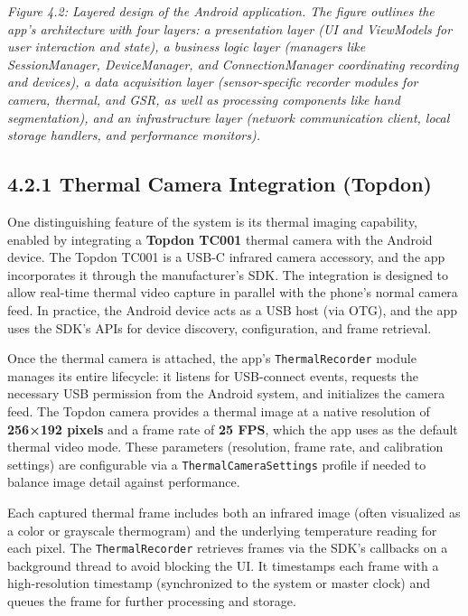 \textit{Figure 4.2: Layered design of the Android application. The figure outlines the app's architecture with four layers: a presentation layer (UI and ViewModels for user interaction and state), a business logic layer (managers like SessionManager, DeviceManager, and ConnectionManager coordinating recording and devices), a data acquisition layer (sensor-specific recorder modules for camera, thermal, and GSR, as well as processing components like hand segmentation), and an infrastructure layer (network communication client, local storage handlers, and performance monitors).}

\subsection{4.2.1 Thermal Camera Integration (Topdon)}

One distinguishing feature of the system is its thermal imaging capability, enabled by integrating a \textbf{Topdon TC001} thermal camera with the Android device. The Topdon TC001 is a USB-C infrared camera accessory, and the app incorporates it through the manufacturer's SDK. The integration is designed to allow real-time thermal video capture in parallel with the phone's normal camera feed. In practice, the Android device acts as a USB host (via OTG), and the app uses the SDK's APIs for device discovery, configuration, and frame retrieval.

Once the thermal camera is attached, the app's \texttt{ThermalRecorder} module manages its entire lifecycle: it listens for USB-connect events, requests the necessary USB permission from the Android system, and initializes the camera feed. The Topdon camera provides a thermal image at a native resolution of \textbf{256×192 pixels} and a frame rate of \textbf{25 FPS}, which the app uses as the default thermal video mode. These parameters (resolution, frame rate, and calibration settings) are configurable via a \texttt{ThermalCameraSettings} profile if needed to balance image detail against performance.

Each captured thermal frame includes both an infrared image (often visualized as a color or grayscale thermogram) and the underlying temperature reading for each pixel. The \texttt{ThermalRecorder} retrieves frames via the SDK's callbacks on a background thread to avoid blocking the UI. It timestamps each frame with a high-resolution timestamp (synchronized to the system or master clock) and queues the frame for further processing and storage.

